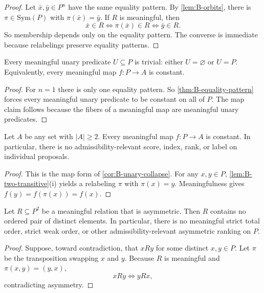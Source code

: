 \begin{proof}
Let $\bar x,\bar y\in P^n$ have the same equality pattern. By \cref{lem:B-orbits}, there is $\pi\in\mathrm{Sym}(P)$ with $\pi(\bar x)=\bar y$. If $R$ is meaningful, then
\[
\bar x\in R \Longleftrightarrow \pi(\bar x)\in R \Longleftrightarrow \bar y\in R.
\]
So membership depends only on the equality pattern. The converse is immediate because relabelings preserve equality patterns.
\end{proof}

\begin{corollary}
\label{cor:B-unary-collapse}
Every meaningful unary predicate $U\subseteq P$ is trivial: either $U=\varnothing$ or $U=P$. Equivalently, every meaningful map $f:P\to A$ is constant.
\end{corollary}

\begin{proof}
For $n=1$ there is only one equality pattern. So \cref{thm:B-equality-pattern} forces every meaningful unary predicate to be constant on all of $P$. The map claim follows because the fibers of a meaningful map are meaningful unary predicates.
\end{proof}

\begin{proposition}
\label{prop:B-no-grading}
Let $A$ be any set with $|A|\ge 2$. Every meaningful map $f:P\to A$ is constant. In particular, there is no admissibility-relevant score, index, rank, or label on individual proposals.
\end{proposition}

\begin{proof}
This is the map form of \cref{cor:B-unary-collapse}. For any $x,y\in P$, \cref{lem:B-two-transitive}(i) yields a relabeling $\pi$ with $\pi(x)=y$. Meaningfulness gives $f(y)=f(\pi(x))=f(x)$.
\end{proof}

\begin{proposition}
\label{prop:B-no-order}
Let $R\subseteq P^2$ be a meaningful relation that is asymmetric. Then $R$ contains no ordered pair of distinct elements. In particular, there is no meaningful strict total order, strict weak order, or other admissibility-relevant asymmetric ranking on $P$.
\end{proposition}

\begin{proof}
Suppose, toward contradiction, that $xRy$ for some distinct $x,y\in P$. Let $\pi$ be the transposition swapping $x$ and $y$. Because $R$ is meaningful and $\pi(x,y)=(y,x)$,
\[
xRy \Longleftrightarrow yRx,
\]
contradicting asymmetry.
\end{proof}

